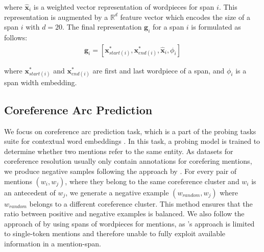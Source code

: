 \documentclass[11pt]{article}
\begin{document}
where $\hat{\pmb{x}}_{i}$ is a weighted vector representation of wordpieces for span $i$. This representation is augmented by a $\mathbb{R}^{d}$ feature vector which encodes the size of a span $i$ with $d = 20$. The final representation $\pmb{g}_{i}$ for a span $i$ is formulated as follows:
\begin{align}
\pmb{g}_{i} = [\pmb{x}_{start(i)}^{*}, \pmb{x}_{end(i)}^{*}, \hat{\pmb{x}}_{i}, \phi_{i}]
\end{align}  

where $\pmb{x}_{start(i)}^{*}$ and $\pmb{x}_{end(i)}^{*}$ are first and last wordpiece of a span, and $\phi_{i}$ is a span width embedding.

\subsection{Coreference Arc Prediction}
\label{subsection:corefarc}



We focus on coreference arc prediction task, which is a part of the probing tasks suite for contextual word embeddings \parencite{liu2019linguistic, tenney2019context}. In this task, a probing model is trained to determine whether two mentions refer to the same entity. As datasets for coreference resolution usually only contain annotations for corefering mentions, we produce negative samples following the approach by \textcite{liu2019linguistic}. For every pair of mentions $(w_{i}, w_{j})$, where they belong to the same coreference cluster and $w_{i}$ is an antecedent of $w_{j}$, we generate a negative example $(w_{random}, w_{j})$ where $w_{random}$ belongs to a different coreference cluster. This method ensures that the ratio between positive and negative examples is balanced. We also follow the approach of \textcite{tenney2019context} by using spans of wordpieces for mentions, as \textcite{liu2019linguistic}'s approach is limited to single-token mentions and therefore unable to fully exploit available information in a mention-span.
\end{document}

